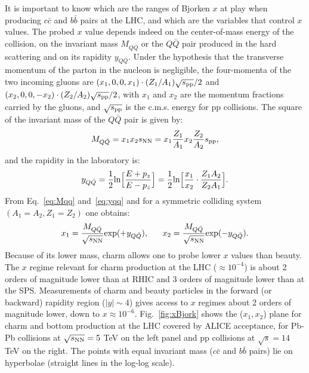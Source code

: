 It is important to know which are the ranges of Bjorken $x$
at play when producing $c\bar{c}$ and $b\bar{b}$ pairs at the LHC, and which are the
variables that control $x$ values. The probed $x$ value depends indeed on the center-of-mass energy
of the collision, on the invariant mass $M_{Q\bar{Q}}$ or the $Q\bar{Q}$ pair produced in the hard scattering
and on its rapidity $y_{Q\bar{Q}}$. Under the hypothesis that the transverse momentum of the parton 
in the nucleon is negligible, the four-momenta of the two incoming gluons are $(x_1,0,0,x_1)\cdot(Z_1/A_1)\sqrt{s_{\rm pp}}/2$
and $(x_2,0,0,-x_2)\cdot(Z_2/A_2)\sqrt{s_{\rm pp}}/2$, with $x_1$ and $x_2$ are the momentum fractions 
carried by the gluons, and $\sqrt{s_{\rm pp}}$ is the c.m.s. energy for pp collisions. 
The square of the invariant mass of the $Q\bar{Q}$ pair is given by:
\begin{equation}
\label{eq:Mqq}
M_{Q\bar{Q}} =  x_1 x_2 s_{\rm NN} = x_1 \frac{Z_1}{A_1} x_2 \frac{Z_2}{A_2} s_{\rm pp},
\end{equation}
and the rapidity in the laboratory is:
\begin{equation}
\label{eq:yqq}
y_{Q\bar{Q}} = \frac{1}{2} {\rm ln} {\Big [ } \frac{E +p_z}{E-p_z}  {\Big ] }= \frac{1}{2} {\rm ln} {\Big [ } \frac{x_1}{x_2} \cdot \frac{Z_1 A_2}{Z_2 A_1} {\Big ] }.    
\end{equation}
From Eq.~\ref{eq:Mqq} and~\ref{eq:yqq} and for a symmetric colliding system $(A_1 = A_2, Z_1 = Z_2)$
one obtains:
\begin{equation}
\label{eq:x1x2}
x_1 = \frac{M_{Q\bar{Q}}}{\sqrt{s_{\rm NN}}} {\rm exp} (+y_{Q\bar{Q}} ), \; \; \; \; \; \;
x_2 = \frac{M_{Q\bar{Q}}}{\sqrt{s_{\rm NN}}} {\rm exp} (-y_{Q\bar{Q}} ). 
\end{equation}
Because of its lower mass, charm allows one to probe lower $x$ values than beauty. 
The $x$ regime relevant for charm production at the LHC ($\approx 10^{-4}$) is about 
2 orders of magnitude lower than at RHIC and 3 orders of magnitude lower than at the SPS.
Measurements of charm and beauty particles in the forward (or backward) rapidity region ($|y| \sim 4 $) 
gives access to $x$ regimes about 2 orders of magnitude lower, down to $x \approx 10^{-6}$.
Fig.~\ref{fig:xBjork} shows the ($x_1, x_2$) plane for charm and bottom production at the LHC
covered by ALICE acceptance, for Pb-Pb
collisions at $\sqrt{s_{\rm NN}} = 5$ TeV on the left panel and pp collisions at $\sqrt{s} = 14$ TeV on the right.
The points with equal invariant mass ($c\bar{c}$ and $b\bar{b}$ pairs) lie on hyperbolae (straight lines in the log-log scale).\\


